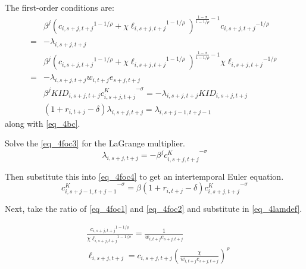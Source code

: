 \documentclass[letterpaper,12pt]{article}
\theoremstyle{definition}
\numberwithin{equation}{section}
\begin{document}
\begin{spacing}{1.5}
	The first-order conditions are:
	\begin{align}
		& \beta^j \left( {c_{i,s+j,t+j}}^{1-1/\rho} + \chi {\ell_{i,s+j,t+j}}^{1-1/\rho}\right)^{\tfrac{{1-\sigma}}{1-1/\rho}-1} {c_{i,s+j,t+j}}^{-1/\rho}  \nonumber \\ = &  - \lambda_{i,s+j,t+j}  \label{eq_4foc1} \\
		& \beta^j \left( {c_{i,s+j,t+j}}^{1-1/\rho} + \chi {\ell_{i,s+j,t+j}}^{1-1/\rho}\right)^{\tfrac{{1-\sigma}}{1-1/\rho}-1} \chi {\ell_{i,s+j,t+j}}^{-1/\rho} \nonumber \\ = & - \lambda_{i,s+j,t+j} w_{i,t+j} e_{s+j,t+j} \label{eq_4foc2} \\
		& \beta^j KID_{i,s+j,t+j}{c^K_{i,s+j,t+j}}^{-\sigma} = - \lambda_{i,s+j,t+j} KID_{i,s+j,t+j} \label{eq_4foc3} \\
               & (1+r_{i,t+j}-\delta) \lambda_{i,s+j,t+j} = \lambda_{i,s+j-1,t+j-1} \label{eq_4foc4}
	\end{align}	
	along with \eqref{eq_4bc}.

	Solve the \eqref{eq_4foc3} for the LaGrange multiplier.
	\begin{equation}\label{eq_4lamdef}
	       \lambda_{i,s+j,t+j} = -\beta^j {c^K_{i,s+j,t+j}}^{-\sigma}
	\end{equation}

	Then substitute this into \eqref{eq_4foc4} to get an intertemporal Euler equation.
	\begin{equation}
	       {c^K_{i,s+j-1,t+j-1}}^{-\sigma} = \beta (1+r_{i,t+j}-\delta) {c^K_{i,s+j,t+j}}^{-\sigma}
	\end{equation}

	Next, take the ratio of \eqref{eq_4foc1} and \eqref{eq_4foc2} and substitute in \eqref{eq_4lamdef}.

	\begin{align}
		& \frac{{c_{i,s+j,t+j}}^{1-1/\rho}} {\chi {\ell_{i,s+j,t+j}}^{1-1/\rho}} = \frac{1}{w_{i,t+j} e_{s+j,t+j}} \nonumber \\
		& \ell_{i,s+j,t+j} = c_{i,s+j,t+j} \left(\frac{\chi}{w_{i,t+j} e_{s+j,t+j}}\right)^\rho \label{eq_4elldef}
 	\end{align}


\end{spacing}
\end{document}
